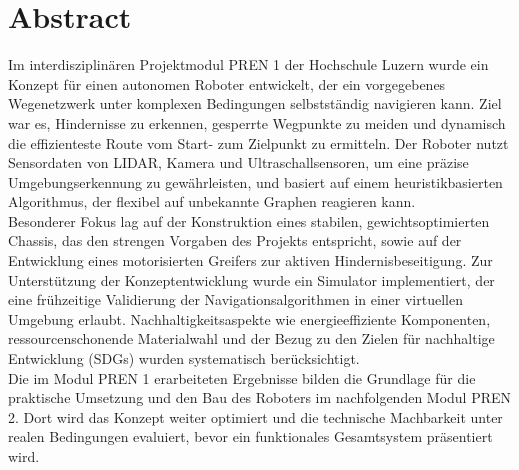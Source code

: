 \documentclass[main.tex]{subfiles} %
\begin{document}
\section*{Abstract}

Im interdisziplinären Projektmodul PREN 1 der Hochschule Luzern wurde ein Konzept 
für einen autonomen Roboter entwickelt, der ein vorgegebenes Wegenetzwerk unter 
komplexen Bedingungen selbstständig navigieren kann. Ziel war es, Hindernisse zu 
erkennen, gesperrte Wegpunkte zu meiden und dynamisch die effizienteste Route vom 
Start- zum Zielpunkt zu ermitteln. Der Roboter nutzt Sensordaten von LIDAR, Kamera 
und Ultraschallsensoren, um eine präzise Umgebungserkennung zu gewährleisten, und 
basiert auf einem heuristikbasierten Algorithmus, der flexibel auf unbekannte 
Graphen reagieren kann.\\

Besonderer Fokus lag auf der Konstruktion eines stabilen, gewichtsoptimierten Chassis, 
das den strengen Vorgaben des Projekts entspricht, sowie auf der Entwicklung eines 
motorisierten Greifers zur aktiven Hindernisbeseitigung. Zur Unterstützung der 
Konzeptentwicklung wurde ein Simulator implementiert, der eine frühzeitige Validierung 
der Navigationsalgorithmen in einer virtuellen Umgebung erlaubt. 
Nachhaltigkeitsaspekte wie energieeffiziente Komponenten, ressourcenschonende 
Materialwahl und der Bezug zu den Zielen für nachhaltige Entwicklung (SDGs) wurden 
systematisch berücksichtigt.\\

Die im Modul PREN 1 erarbeiteten Ergebnisse bilden die Grundlage für die praktische 
Umsetzung und den Bau des Roboters im nachfolgenden Modul PREN 2. Dort wird das 
Konzept weiter optimiert und die technische Machbarkeit unter realen Bedingungen 
evaluiert, bevor ein funktionales Gesamtsystem präsentiert wird.
\end{document}
